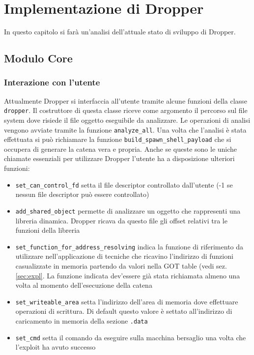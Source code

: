\chapter{Implementazione di Dropper}
\label{cap:implementazione}

In questo capitolo si farà un'analisi dell'attuale stato di sviluppo
di Dropper.

\section{Modulo Core}

\subsection{Interazione con l'utente}

Attualmente Dropper si interfaccia all'utente tramite alcune funzioni
della classe \lstinline{dropper}. Il costruttore di questa classe
riceve come argomento il percorso sul file system dove risiede il file
oggetto eseguibile da analizzare. Le operazioni di analisi vengono
avviate tramite la funzione \lstinline{analyze_all}. Una volta che
l'analisi è stata effettuata si può richiamare la funzione
\lstinline{build_spawn_shell_payload} che si occupera di generare la
catena vera e propria. Anche se queste sono le uniche chiamate
essenziali per utilizzare Dropper l'utente ha a disposizione ulteriori
funzioni:
\begin{itemize}

\item \lstinline{set_can_control_fd} setta il file descriptor
  controllato dall'utente (-1 se nessun file descriptor può essere
  controllato)

\item \lstinline{add_shared_object} permette di analizzare un oggetto
  che rappresenti una libreria dinamica. Dropper ricava da questo file
  gli offset relativi tra le funzioni della libreria

\item \lstinline{set_function_for_address_resolving} indica la
  funzione di riferimento da utilizzare nell'applicazione di tecniche
  che ricavino l'indirizzo di funzioni casualizzate in memoria
  partendo da valori nella GOT table (vedi sez. \ref{sec:expl}. La
  funzione indicata dev'essere già stata richiamata almeno una volta
  al momento dell'esecuzione della catena

\item \lstinline{set_writeable_area} setta l'indirizzo dell'area di
  memoria dove effettuare operazioni di scrittura. Di default questo
  valore è settato all'indirizzo di caricamento in memoria della
  sezione \lstinline{.data}

\item \lstinline{set_cmd} setta il comando da eseguire sulla macchina
  bersaglio una volta che l'exploit ha avuto successo

\end{itemize}

